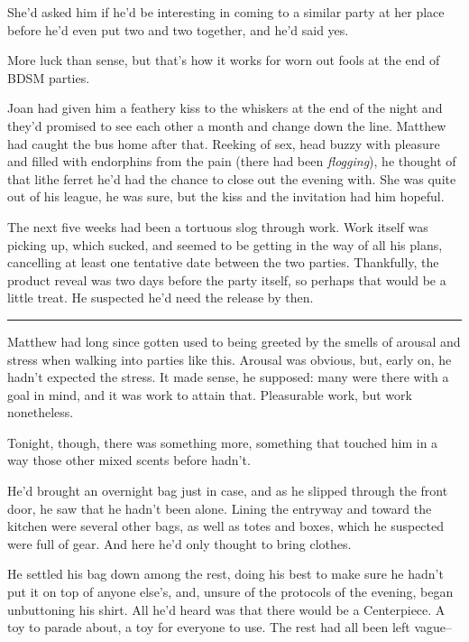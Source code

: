 She'd asked him if he'd be interesting in coming to a similar party at her place before he'd even put two and two together, and he'd said yes.

More luck than sense, but that's how it works for worn out fools at the end of BDSM parties.

Joan had given him a feathery kiss to the whiskers at the end of the night and they'd promised to see each other a month and change down the line. Matthew had caught the bus home after that. Reeking of sex, head buzzy with pleasure and filled with endorphins from the pain (there had been \emph{flogging}), he thought of that lithe ferret he'd had the chance to close out the evening with. She was quite out of his league, he was sure, but the kiss and the invitation had him hopeful.

The next five weeks had been a tortuous slog through work. Work itself was picking up, which sucked, and seemed to be getting in the way of all his plans, cancelling at least one tentative date between the two parties. Thankfully, the product reveal was two days before the party itself, so perhaps that would be a little treat. He suspected he'd need the release by then.

\begin{center}\rule{0.5\linewidth}{\linethickness}\end{center}

Matthew had long since gotten used to being greeted by the smells of arousal and stress when walking into parties like this. Arousal was obvious, but, early on, he hadn't expected the stress. It made sense, he supposed: many were there with a goal in mind, and it was work to attain that. Pleasurable work, but work nonetheless.

Tonight, though, there was something more, something that touched him in a way those other mixed scents before hadn't.

He'd brought an overnight bag just in case, and as he slipped through the front door, he saw that he hadn't been alone. Lining the entryway and toward the kitchen were several other bags, as well as totes and boxes, which he suspected were full of gear. And here he'd only thought to bring clothes.

He settled his bag down among the rest, doing his best to make sure he hadn't put it on top of anyone else's, and, unsure of the protocols of the evening, began unbuttoning his shirt. All he'd heard was that there would be a Centerpiece. A toy to parade about, a toy for everyone to use. The rest had all been left vague--

